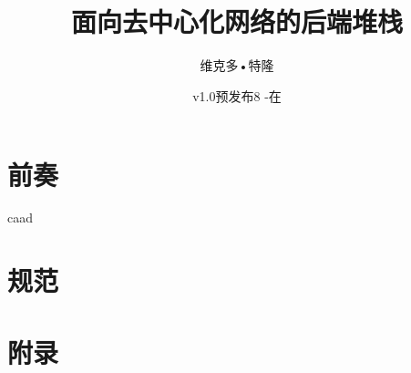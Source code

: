 \documentclass[a4paper,12pt,openany,hyperfootnotes,hidelinks]{scrbook}
\title{\Huge\sc蜂群的书
\Large存储和通信基础设施的自我主权数字社会\\
面向去中心化网络的后端堆栈}
\author{维克多•特隆}
\date{v1.0预发布8 -在\today上工作}
\newif\ifdraft
\begin{document}
\frontmatter
\maketitle
\setcounter{tocdepth}{2}


\ifdraft
编译和分发的说明。

如果不显示条件文本(在发布版本时)，则隐藏这些选项。

\begin{enumerate}
    \item 任何正在工作的版本应该被命名为“版本vX -工作”;
    \item 在出版时，“曾工作过”应删除; 
    \item Drafttrue line应该注释掉，在编译时删除条件文本;
    \item PDF应该生成，保存和推到Github repo \\ (https://github.com/ethersphere/publish-bookofswarm/tree/master/pdfs); \item 验证上次提交是自动部署到Swarm \\ (https://swarm-gateways.net/bzz:/latest.bookofswarm.eth/the-book-of-swarm-viktor-tron.pdf);
    \item 在Github repo中的PDF提交应该以版本号命名;
    \item Latex中的版本号应该被提升，“已完成”注释添加:“版本v(X+1) -已完成”;
    \item 转到1。
\end{enumerate}
\fi


\tableofcontents
\listoffigures

\label{sec:toc}
 
\mainmatter
\part{前奏} \label{part:preface}

caad \label{part:designarchitecture}

\part{规范}
\label{part:specifications}

{}

\appendix
\part{附录}\label{part:appendix}

\backmatter
\end{document}
